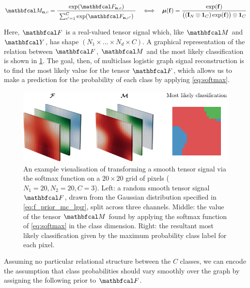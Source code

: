 \begin{equation}
    \label{eq:softmax}
    \Mt_{\nn, c} = \frac{\exp(\Ft_{\nn, c})}{ \raisebox{-0.1cm} { $\sum_{c'=1}^C \exp(\Ft_{\nn, c'})$ }}  \quad \Longleftrightarrow \quad \muu(\f) = \frac{\exp(\f)}{ \big((\I_N \otimes \one_C) \exp(\f)\big) \otimes \one_C}
\end{equation}

Here, $\Ft$ is a real-valued tensor signal which, like $\Mt$ and $\Yt$, has shape $(N_1 \times ... \times N_d \times C)$. A graphical representation of the relation between $\Ft$, $\Mt$ and the most likely classification is shown in \cref{fig:logistic_gsr_multiclass}. The goal, then, of multiclass logistic graph signal reconstruction is to find the most likely value for the tensor $\Ft$, which allows us to make a prediction for the probability of each class by applying \cref{eq:softmax}.  

\begin{figure}[t]  
    \begin{center}
        \includegraphics[width=\linewidth]{Figures/multiclass.pdf}
    \end{center}
   \caption[Visualisation of multiclass classification on a 2D lattice]{An example visualisation of transforming a smooth tensor signal via the softmax function on a $20 \times 20$ grid of pixels ($N_1 = 20, N_2 = 20, C=3$). Left: a random smooth tensor signal $\Ft$, drawn from the Gaussian distribution specified in \cref{eq:f_prior_mc_lgsr}, split across three channels. Middle: the value of the tensor $\Mt$ found by applying the softmax function of \cref{eq:softmax} in the class dimension. Right: the resultant most likely classification given by the maximum probability class label for each pixel. } 
    \label{fig:logistic_gsr_multiclass}
\end{figure} 


Assuming no particular relational structure between the $C$ classes, we can encode the assumption that class probabilities should vary smoothly over the graph by assigning the following prior to $\Ft$. 

